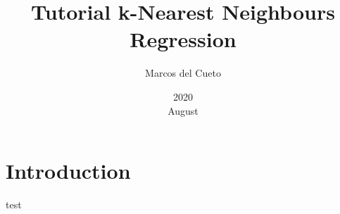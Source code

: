 \documentclass{article}%
\title{Tutorial k-Nearest Neighbours Regression}
\date{2020\\ August}
\author{Marcos del Cueto}
\begin{document}
\maketitle
\section{Introduction}
test
\end{document}
